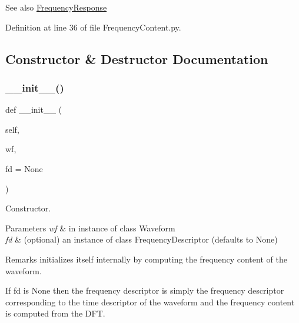 \begin{DoxySeeAlso}{See also}
\hyperlink{namespaceSignalIntegrity_1_1FrequencyDomain_1_1FrequencyResponse}{Frequency\+Response} 
\end{DoxySeeAlso}


Definition at line 36 of file Frequency\+Content.\+py.



\subsection{Constructor \& Destructor Documentation}
\mbox{\label{classSignalIntegrity_1_1FrequencyDomain_1_1FrequencyContent_1_1FrequencyContent_a6206b0356859e0b87ba95eefb298c2bf}} 
\subsubsection{\texorpdfstring{\+\_\+\+\_\+init\+\_\+\+\_\+()}{\_\_init\_\_()}}
{\footnotesize\ttfamily def \+\_\+\+\_\+init\+\_\+\+\_\+ (\begin{DoxyParamCaption}\item[{}]{self,  }\item[{}]{wf,  }\item[{}]{fd = {\ttfamily None} }\end{DoxyParamCaption})}



Constructor. 


\begin{DoxyParams}{Parameters}
{\em wf} & in instance of class Waveform \\
\hline
{\em fd} & (optional) an instance of class Frequency\+Descriptor (defaults to None) \\
\hline
\end{DoxyParams}
\begin{DoxyRemark}{Remarks}
initializes itself internally by computing the frequency content of the waveform.
\end{DoxyRemark}
If fd is None then the frequency descriptor is simply the frequency descriptor corresponding to the time descriptor of the waveform and the frequency content is computed from the D\+FT.

